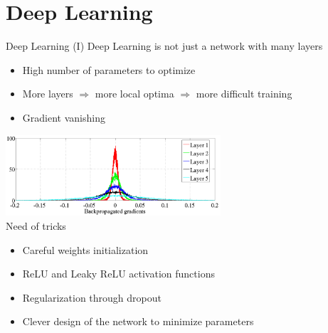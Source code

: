 \documentclass[10pt,compress]{beamer} %
\begin{document}
\section{Deep Learning}

\begin{frame}{Deep Learning (I)}
    Deep Learning is not just a network with many layers
	\begin{itemize}
        \item High number of parameters to optimize
		\item More layers $\Rightarrow$ more local optima $\Rightarrow$ more difficult training
		\item Gradient vanishing
	\end{itemize}

	\centering
	\includegraphics[width=0.6\textwidth]{figs/gradients.png}\\

	\normalsize
	\flushleft
	Need of tricks
	\begin{itemize}
		\item Careful weights initialization
		\item ReLU and Leaky ReLU activation functions
		\item Regularization through \alert{dropout}
        \item Clever design of the network to minimize parameters
	\end{itemize}
\end{frame}
\end{document}
